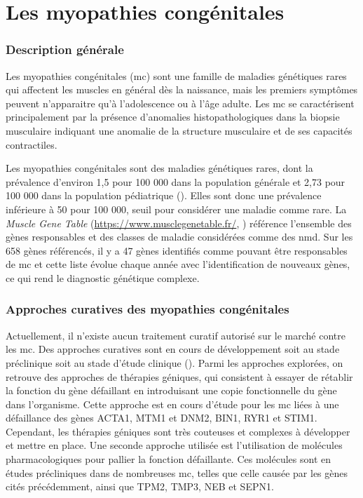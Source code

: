 \section{Les myopathies congénitales}
\subsubsection{Description générale}
Les myopathies congénitales (\gls{mc}) sont une famille de maladies génétiques rares qui affectent les muscles en général dès la naissance, mais les premiers symptômes peuvent n'apparaitre qu'à l'adolescence ou à l'âge adulte. Les \gls{mc} se caractérisent principalement par la présence d'anomalies histopathologiques dans la biopsie musculaire indiquant une anomalie de la structure musculaire et de ses capacités contractiles.

Les myopathies congénitales sont des maladies génétiques rares, dont la prévalence d'environ 1,5 pour 100 000 dans la population générale et 2,73 pour 100 000 dans la population pédiatrique (\cite{huang_systematic_2021}). Elles sont donc une prévalence inférieure à 50 pour 100 000, seuil pour considérer une maladie comme rare. La \textit{Muscle Gene Table} (\url{https://www.musclegenetable.fr/}, \cite{benarroch_2023_2023}) référence l'ensemble des gènes  responsables et des classes de maladie considérées comme des \gls{nmd}. Sur les 658 gènes référencés, il y a 47 gènes identifiés comme pouvant être responsables de \gls{mc} et cette liste évolue chaque année avec l'identification de nouveaux gènes, ce qui rend le diagnostic génétique complexe. 

\subsubsection{Approches curatives des myopathies congénitales}
Actuellement, il n'existe aucun traitement curatif autorisé sur le marché contre les \gls{mc}. Des approches curatives sont en cours de développement soit au stade préclinique soit au stade d'étude clinique (\cite{gineste_therapeutic_2023, guan_gene_2016}). Parmi les approches explorées, on retrouve des approches de thérapies géniques, qui consistent à essayer de rétablir la fonction du gène défaillant en introduisant une copie fonctionnelle du gène dans l'organisme. Cette approche est en cours d'étude pour les \gls{mc} liées à une défaillance des gènes ACTA1, MTM1 et DNM2, BIN1, RYR1 et STIM1. Cependant, les thérapies géniques sont très couteuses et complexes à développer et mettre en place. Une seconde approche utilisée est l'utilisation de molécules pharmacologiques pour pallier la fonction défaillante. Ces molécules sont en études précliniques dans de nombreuses \gls{mc}, telles que celle causée par les gènes cités précédemment, ainsi que TPM2, TMP3, NEB et SEPN1. 

